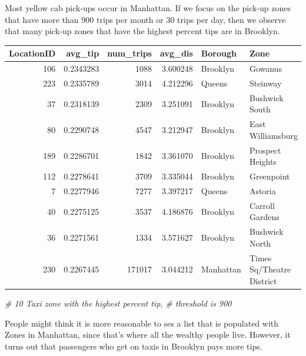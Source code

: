 \documentclass[12pt,twoside]{reedthesis}
\newenvironment{Shaded}{\begin{snugshade}}{\end{snugshade}}
\newcommand{\KeywordTok}[1]{\textcolor[rgb]{0.13,0.29,0.53}{\textbf{#1}}}
\newcommand{\DecValTok}[1]{\textcolor[rgb]{0.00,0.00,0.81}{#1}}
\newcommand{\StringTok}[1]{\textcolor[rgb]{0.31,0.60,0.02}{#1}}
\newcommand{\CommentTok}[1]{\textcolor[rgb]{0.56,0.35,0.01}{\textit{#1}}}
\newcommand{\OperatorTok}[1]{\textcolor[rgb]{0.81,0.36,0.00}{\textbf{#1}}}
\newcommand{\NormalTok}[1]{#1}
\theoremstyle{definition}
\theoremstyle{definition}
\theoremstyle{definition}
\theoremstyle{remark}
\begin{document}
Most yellow cab pick-ups occur in Manhattan. If we focus on the pick-up
zones that have more than 900 trips per month or 30 trips per day, then
we observe that many pick-up zones that have the highest percent tips
are in Brooklyn.
\begin{Shaded}
\end{Shaded}
\begin{tabular}{r|r|r|r|l|l}
\hline
LocationID & avg\_tip & num\_trips & avg\_dis & Borough & Zone\\
\hline
106 & 0.2343283 & 1088 & 3.600248 & Brooklyn & Gowanus\\
\hline
223 & 0.2335789 & 3014 & 4.212296 & Queens & Steinway\\
\hline
37 & 0.2318139 & 2309 & 3.251091 & Brooklyn & Bushwick South\\
\hline
80 & 0.2290748 & 4547 & 3.212947 & Brooklyn & East Williamsburg\\
\hline
189 & 0.2286701 & 1842 & 3.361070 & Brooklyn & Prospect Heights\\
\hline
112 & 0.2278641 & 3709 & 3.335044 & Brooklyn & Greenpoint\\
\hline
7 & 0.2277946 & 7277 & 3.397217 & Queens & Astoria\\
\hline
40 & 0.2275125 & 3537 & 4.186876 & Brooklyn & Carroll Gardens\\
\hline
36 & 0.2271561 & 1334 & 3.571627 & Brooklyn & Bushwick North\\
\hline
230 & 0.2267445 & 171017 & 3.044212 & Manhattan & Times Sq/Theatre District\\
\hline
\end{tabular}
\begin{Shaded}
\begin{Highlighting}[]
\CommentTok{# 10 Taxi zone with the highest percent tip,}
\CommentTok{# threshold is 900}
\end{Highlighting}
\end{Shaded}
People might think it is more reasonable to ses a list that is populated
with Zones in Manhattan, since that's where all the wealthy people live.
However, it turns out that passengers who get on taxis in Brooklyn pays
more tips.
\end{document}
